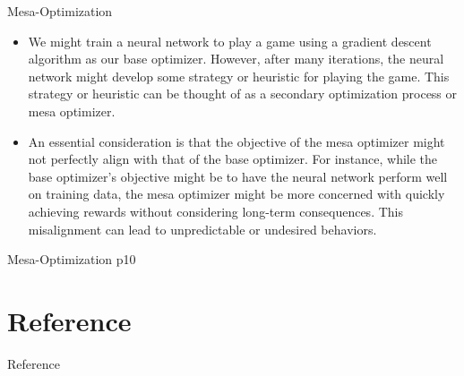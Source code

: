 \documentclass[aspectratio=1610,xcolor={dvipsnames},hyperref={colorlinks,unicode,linkcolor=violet,anchorcolor=BlueViolet,citecolor=YellowOrange,filecolor=black,urlcolor=Aquamarine}]{beamer}
\begin{document}
\begin{frame}[label={sec:orgf804976}]{Mesa-Optimization}
\begin{itemize}
\item We might train a neural network to play a game using a gradient descent algorithm as our base optimizer. However, after many iterations, the neural network might develop some strategy or heuristic for playing the game. This strategy or heuristic can be thought of as a secondary optimization process or mesa optimizer.

\item An essential consideration is that the objective of the mesa optimizer might not perfectly align with that of the base optimizer. For instance, while the base optimizer's objective might be to have the neural network perform well on training data, the mesa optimizer might be more concerned with quickly achieving rewards without considering long-term consequences. This misalignment can lead to unpredictable or undesired behaviors.
\end{itemize}
\end{frame}
\begin{frame}[label={sec:org4f0b494}]{Mesa-Optimization}
p10
\end{frame}
\section{Reference}
\label{sec:org5924acd}

\begin{frame}[allowframebreaks]{Reference}
\printbibliography
\end{frame}
\end{document}
